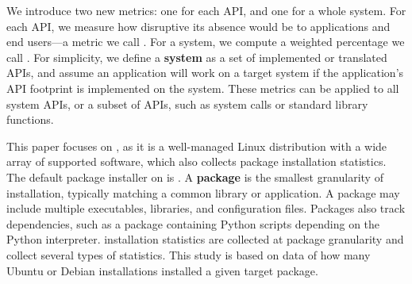
We introduce two new metrics: one for each API, and one for a whole system.
For each API, we measure how disruptive its absence
would be to applications and end users---a metric we call {\bf  \usagemetric{}}.
For a system, we compute a weighted percentage we call {\bf \compatmetric{}}. 
For simplicity, we define a {\bf system} as a set of implemented or translated APIs,
and assume an 
application will work on a target system if the application's API footprint is implemented on the system.
These metrics can be applied to all system APIs,
or a subset of APIs,
such as system calls 
or standard library functions.



This paper focuses on \osdist{}, as it is a well-managed Linux distribution with a wide array of 
supported software, which also collects
package installation statistics.
The default package installer on \osdist{} is \osinstaller{}.
A {\bf package} is the smallest granularity of installation, typically
matching a common library or application.
A package may include
multiple executables, libraries, and configuration files.
Packages also track dependencies, such as a package containing 
Python scripts depending on the Python interpreter.
\osdist{} installation statistics are collected at package granularity
and collect several types of statistics.
This study is based on
data of how many
Ubuntu or Debian installations
installed a given target package.

